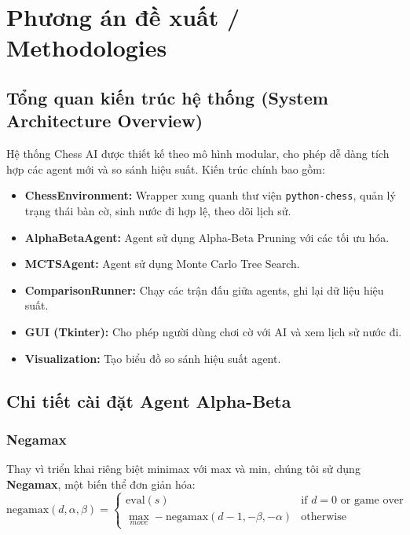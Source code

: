 \section{Phương án đề xuất / Methodologies}

\subsection{Tổng quan kiến trúc hệ thống (System Architecture Overview)}
Hệ thống Chess AI được thiết kế theo mô hình modular, cho phép dễ dàng tích hợp các agent mới và so sánh hiệu suất. Kiến trúc chính bao gồm:

\begin{itemize}
    \item \textbf{ChessEnvironment:} Wrapper xung quanh thư viện \texttt{python-chess}, quản lý trạng thái bàn cờ, sinh nước đi hợp lệ, theo dõi lịch sử.
    \item \textbf{AlphaBetaAgent:} Agent sử dụng Alpha-Beta Pruning với các tối ưu hóa.
    \item \textbf{MCTSAgent:} Agent sử dụng Monte Carlo Tree Search.
    \item \textbf{ComparisonRunner:} Chạy các trận đấu giữa agents, ghi lại dữ liệu hiệu suất.
    \item \textbf{GUI (Tkinter):} Cho phép người dùng chơi cờ với AI và xem lịch sử nước đi.
    \item \textbf{Visualization:} Tạo biểu đồ so sánh hiệu suất agent.
\end{itemize}

\subsection{Chi tiết cài đặt Agent Alpha-Beta}

\subsubsection{Negamax}
Thay vì triển khai riêng biệt minimax với max và min, chúng tôi sử dụng \textbf{Negamax}, một biến thể đơn giản hóa:
\begin{equation*}
\text{negamax}(d, \alpha, \beta) = \begin{cases}
\text{eval}(s) & \text{if } d = 0 \text{ or game over} \\
\max_{move} -\text{negamax}(d-1, -\beta, -\alpha) & \text{otherwise}
\end{cases}
\end{equation*}

